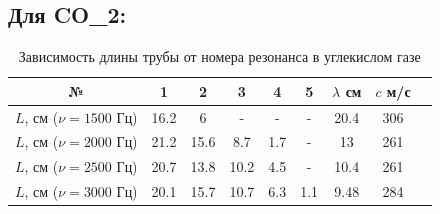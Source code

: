 \newpage

\subsection*{Для CO_2:}
\begin{table}[h!]
    \centering
    \begin{tabular}{|c|c|c|c|c|c|c|c|c|}
        \hline
        № &1 & 2 & 3 & 4 & 5 & $\lambda$ см & $c$ м/с \\\hline
        $L$, см ($\nu = 1500$ Гц) & 16.2 & 6 & - & - & -  &20.4 & 306  \\\hline
        $L$, см ($\nu = 2000$ Гц) & 21.2& 15.6 &8.7 & 1.7 & -  & 13 & 261 \\\hline
        $L$, см ($\nu = 2500$ Гц) & 20.7& 13.8 & 10.2 & 4.5 &- & 10.4 & 261 \\\hline
        $L$, см ($\nu = 3000$ Гц) & 20.1& 15.7 &10.7 & 6.3 & 1.1 & 9.48& 284  \\\hline
    \end{tabular}
    \caption{Зависимость длины трубы от номера резонанса в углекислом газе}
\end{table}

